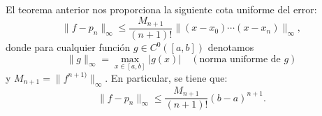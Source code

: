 \begin{remark}
  \label{rk:2}
  El teorema anterior nos proporciona la siguiente cota uniforme del
  error:
  \begin{equation}
    \|f-p_n\|_{\infty} \le \frac{M_{n+1}}{(n+1)!}\|(x-x_0)\cdots(x-x_n)\|_\infty,
    \label{eq:cota-error-interpol-1}
  \end{equation}
  donde para cualquier función $g\in C^0([a,b])$ denotamos
  \begin{equation*}
    \|g\|_\infty = \max_{x\in[a,b]} |g(x)|  \quad (\text{norma
      uniforme de $g$})
  \end{equation*}
  y $M_{n+1}=\|f^{n+1)}\|_\infty$.  En particular, se tiene que:
  \begin{equation*}
    \|f-p_n\|_{\infty} \le \frac{M_{n+1}}{(n+1)!}(b-a)^{n+1}.
    \label{eq:cota-error-interpol-2}
  \end{equation*}
\end{remark}

